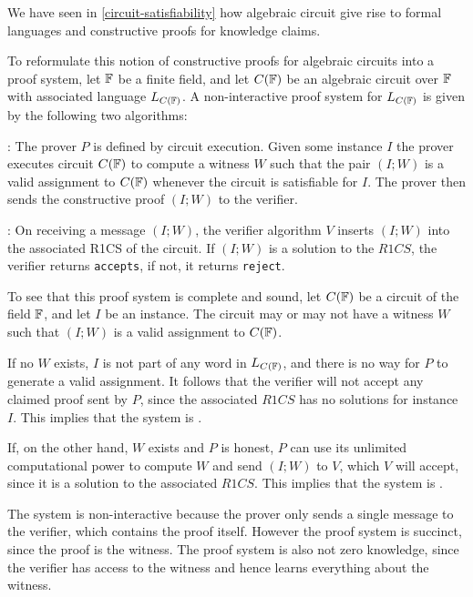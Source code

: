 \begin{example} We have seen in \ref{circuit-satisfiability} how algebraic circuit give rise to formal languages and constructive proofs for knowledge claims.

To reformulate this notion of constructive proofs for algebraic circuits into a proof system, let $\mathbb{F}$ be a finite field, and let $C(\mathbb{F})$ be an algebraic circuit over $\mathbb{F}$ with associated language $L_{C(\mathbb{F})}$. A non-interactive proof system for $L_{C(\mathbb{F})}$ is given by the following two algorithms:

: The prover $P$ is defined by circuit execution. Given some instance $I$ the prover executes circuit $C(\mathbb{F})$ to compute a witness $W$ such that the pair $(I;W)$ is a valid assignment to $C(\mathbb{F})$ whenever the circuit is satisfiable for $I$. The prover then sends the constructive proof $(I;W)$ to the verifier.

: On receiving a message $(I;W)$, the verifier algorithm $V$ inserts $(I;W)$ into the associated R1CS of the circuit. If $(I;W)$ is a solution to the $R1CS$, the verifier returns \texttt{accepts}, if not, it returns \texttt{reject}. 

To see that this proof system is complete and sound, let $C(\mathbb{F})$ be a circuit of the field $\mathbb{F}$, and let $I$ be an instance. The circuit may or may not have a witness $W$ such that $(I;W)$ is a valid assignment to $C(\mathbb{F})$. 

If no $W$ exists, $I$ is not part of any word in $L_{C(\mathbb{F})}$, and there is no way for $P$ to generate a valid assignment. It follows that the verifier will not accept any claimed proof sent by $P$, since the associated $R1CS$ has no solutions for instance $I$. This implies that the system is .

If, on the other hand, $W$ exists and $P$ is honest, $P$ can use its unlimited computational power to compute $W$ and send $(I;W)$ to $V$, which $V$ will accept, since it is a solution to the associated $R1CS$. This implies that the system is .

The system is non-interactive because the prover only sends a single message to the verifier, which contains the proof itself. However the proof system is  succinct, since the proof is the witness. The proof system is also not zero knowledge, since the verifier has access to the witness and hence learns everything about the witness.
\end{example}

